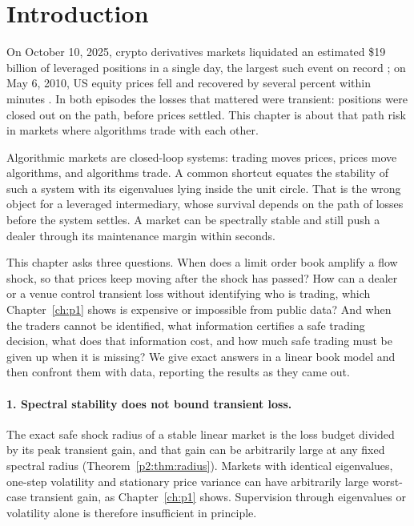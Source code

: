 \section{Introduction}

On October 10, 2025, crypto derivatives markets liquidated an estimated \$19 billion of leveraged positions in a single day, the largest such event on record \citep{p2:shares2025}; on May 6, 2010, US equity prices fell and recovered by several percent within minutes \citep{p2:kirilenko2017}. In both episodes the losses that mattered were transient: positions were closed out on the path, before prices settled. This chapter is about that path risk in markets where algorithms trade with each other.

Algorithmic markets are closed-loop systems: trading moves prices, prices move algorithms, and algorithms trade. A common shortcut equates the stability of such a system with its eigenvalues lying inside the unit circle. That is the wrong object for a leveraged intermediary, whose survival depends on the path of losses before the system settles. A market can be spectrally stable and still push a dealer through its maintenance margin within seconds.

This chapter asks three questions. When does a limit order book amplify a flow shock, so that prices keep moving after the shock has passed? How can a dealer or a venue control transient loss without identifying who is trading, which Chapter~\ref{ch:p1} shows is expensive or impossible from public data? And when the traders cannot be identified, what information certifies a safe trading decision, what does that information cost, and how much safe trading must be given up when it is missing? We give exact answers in a linear book model and then confront them with data, reporting the results as they came out.

\paragraph{1. Spectral stability does not bound transient loss.} The exact safe shock radius of a stable linear market is the loss budget divided by its peak transient gain, and that gain can be arbitrarily large at any fixed spectral radius (Theorem~\ref{p2:thm:radius}). Markets with identical eigenvalues, one-step volatility and stationary price variance can have arbitrarily large worst-case transient gain, as Chapter~\ref{ch:p1} shows. Supervision through eigenvalues or volatility alone is therefore insufficient in principle.

